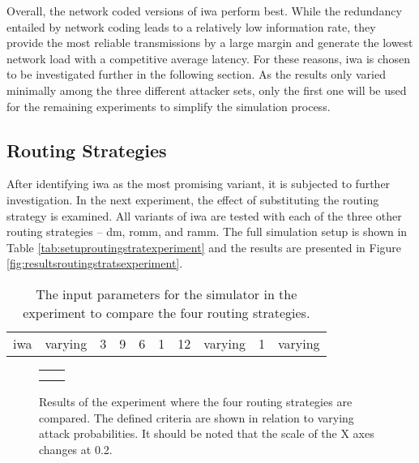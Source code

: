 Overall, the network coded versions of \gls{iwa} perform best. While the redundancy entailed by network coding leads to a relatively low information
rate, they provide the most reliable transmissions by a large margin and generate the lowest network load with a competitive average latency. For
these reasons, \gls{iwa} is chosen to be investigated further in the following section. As the results only varied minimally among the three different
attacker sets, only the first one will be used for the remaining experiments to simplify the simulation process.

\subsection{Routing Strategies}
After identifying \gls{iwa} as the most promising variant, it is subjected to further investigation. In the next experiment, the effect of substituting
the routing strategy is examined. All variants of \gls{iwa} are tested with each of the three other routing strategies -- \gls{dm}, \gls{romm}, and
\gls{ramm}. The full simulation setup is shown in Table \vref{tab:setuproutingstratexperiment} and the results are presented in Figure
\vref{fig:resultsroutingstratsexperiment}.

\begin{table}
    \centering
    \begin{tabulary}{\textwidth}{C|C|C|C|C|C|C|C|C|C}
        \pProtVar{} & \pNCMode{} & \pEncMods{} & \pAuthMods{} & \pRQSize{} & \pARQLimit{} & \pARQTimeout{} & \pRStrat{} & \pAttackerSet{} & \pAttackProb{} \\\hline
        \gls{iwa} & varying & 3 & 9 & 6 & 1 & 12 & varying & 1 & varying \\
    \end{tabulary}
    \caption[Input parameters for routing strategies experiment]{The input parameters for the simulator in the experiment to compare the four routing
    strategies.}
    \label{tab:setuproutingstratexperiment}
\end{table}

\begin{figure}
    \centering
    \begin{tabular}{cc}
         &  \\
         & 
    \end{tabular}
    \caption[Results for routing strategies experiment]{Results of the experiment where the four routing strategies are compared. The defined criteria
    are shown in relation to varying attack probabilities. It should be noted that the scale of the X axes changes at 0.2.}
    \label{fig:resultsroutingstratsexperiment}
\end{figure}

